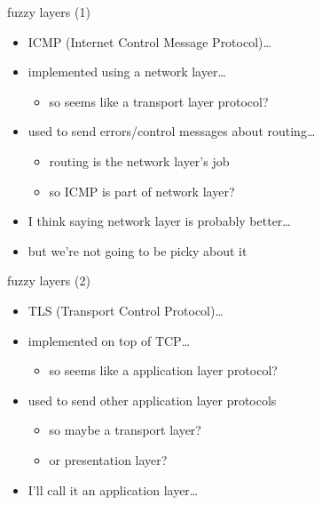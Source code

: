 \begin{frame}{fuzzy layers (1)}
    \begin{itemize}
    \item ICMP (Internet Control Message Protocol)\ldots
    \item {implemented using a network layer}\ldots
        \begin{itemize}
        \item so seems like a transport layer protocol?
        \end{itemize}
    \item<2-> used to send errors/control messages about routing\ldots
        \begin{itemize}
        \item routing is the network layer's job
        \item so ICMP is part of network layer?
        \end{itemize}
    \vspace{.5cm}
    \item<3-> I think saying network layer is probably better\ldots
    \item<3-> but we're not going to be picky about it
    \end{itemize}
\end{frame}

\begin{frame}{fuzzy layers (2)}
    \begin{itemize}
    \item TLS (Transport Control Protocol)\ldots
    \item implemented on top of TCP\ldots
        \begin{itemize}
        \item so seems like a application layer protocol?
        \end{itemize}
    \item<2-> used to send other application layer protocols
        \begin{itemize}
        \item so maybe a transport layer?
        \item or presentation layer?
        \end{itemize}
    \vspace{.5cm}
    \item<2-> I'll call it an application layer\ldots
    \end{itemize}
\end{frame}

